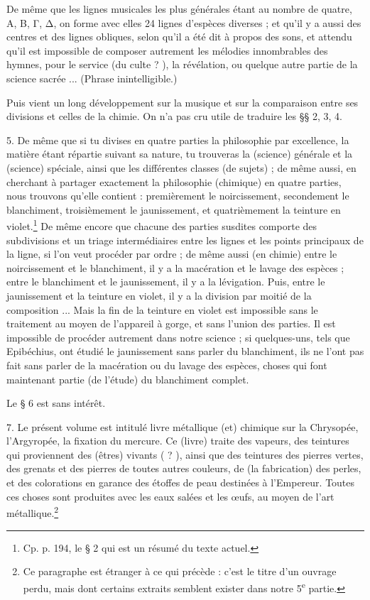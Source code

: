 \documentclass[landscape, a4paper, 11pt, oneside, polutonikogreek, french]{article}
\begin{document}
De même que les lignes musicales les plus générales étant au nombre de quatre, Α, Β, Γ, Δ, on forme avec elles 24 lignes d'espèces diverses ; et qu'il y a aussi des centres et des lignes obliques, selon qu'il a été dit à propos des sons, et attendu qu'il est impossible de composer autrement les mélodies innombrables des hymnes, pour le service (du culte ? ), la révélation, ou quelque autre partie de la science sacrée ... (Phrase inintelligible.)

Puis vient un long développement sur la musique et sur la comparaison entre ses divisions et celles de la chimie. On n'a pas cru utile de traduire les §§ 2, 3, 4.

5. De même que si tu divises en quatre parties la philosophie par excellence, la matière étant répartie suivant sa nature, tu trouveras la (science) générale et la (science) spéciale, ainsi que les différentes classes (de sujets) ; de même aussi, en cherchant à partager exactement la philosophie (chimique) en quatre parties, nous trouvons qu'elle contient : premièrement le noircissement, secondement le blanchiment, troisièmement le jaunissement, et quatrièmement la teinture en violet.\footnote{Cp. p. 194, le § 2 qui est un résumé du texte actuel.} De même encore que chacune des parties susdites comporte des subdivisions et un triage intermédiaires entre les lignes et les points principaux de la ligne, si l'on veut procéder par ordre ; de même aussi (en chimie) entre le noircissement et le blanchiment, il y a la macération et le lavage des espèces ; entre le blanchiment et le jaunissement, il y a la lévigation. Puis, entre le jaunissement et la teinture en violet, il y a la division par moitié de la composition ... Mais la fin de la teinture en violet est impossible sans le traitement au moyen de l'appareil à gorge, et sans l'union des parties. Il est impossible de procéder autrement dans notre science ; si quelques-uns, tels que Epibéchius, ont étudié le jaunissement sans parler du blanchiment, ils ne l'ont pas fait sans parler de la macération ou du lavage des espèces, choses qui font maintenant partie (de l'étude) du blanchiment complet.

Le § 6 est sans intérêt.

7. Le présent volume est intitulé livre métallique (et) chimique sur la Chrysopée, l'Argyropée, la fixation du mercure. Ce (livre) traite des vapeurs, des teintures qui proviennent des (êtres) vivants ( ? ), ainsi que des teintures des pierres vertes, des grenats et des pierres de toutes autres couleurs, de (la fabrication) des perles, et des colorations en garance des étoffes de peau destinées à l'Empereur. Toutes ces choses sont produites avec les eaux salées et les œufs, au moyen de l'art métallique.\footnote{Ce paragraphe est étranger à ce qui précède : c'est le titre d'un ouvrage perdu, mais dont certains extraits semblent exister dans notre 5\textsuperscript{e} partie.}
\end{document}
